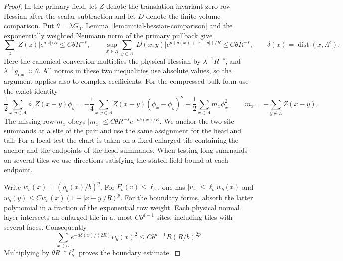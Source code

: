 \documentclass[11pt]{article}
\theoremstyle{definition}
\begin{document}
\begin{proof}
In the primary field, let \(Z\) denote the translation-invariant
zero-row Hessian after the scalar subtraction and let \(D\)
denote the finite-volume comparison. Put
\(\theta=\lambda G_0\). Lemma~\ref{lem:initial-hessian-comparison}
and the exponentially weighted
Neumann norm of the primary pullback give
\begin{equation}
 \sum_z |Z(z)|e^{a|z|/R}\le C\theta R^{-s},\qquad
 \sup_{x\in\Lambda}\sum_{y\in\Lambda}
   |D(x,y)|e^{a(\delta(x)+|x-y|)/R}\le C\theta R^{-s},
 \qquad \delta(x)=\operatorname{dist}(x,\Lambda^c).
\end{equation}
Here the canonical conversion multiplies the physical Hessian
by \(\lambda^{-1}R^{-s}\), and
\(\lambda^{-1}g_{\mathrm{mic}}\asymp\theta\).
All norms in these two inequalities use absolute values, so the
argument applies also to complex coefficients. For the compressed
bulk form use the exact identity
\begin{equation}
 \frac12\sum_{x,y\in\Lambda}\phi_x Z(x-y)\phi_y
 =-\frac14\sum_{x,y\in\Lambda}Z(x-y)(\phi_x-\phi_y)^2
   +\frac12\sum_{x\in\Lambda}m_x\phi_x^2,
 \qquad
 m_x=-\sum_{y\notin\Lambda}Z(x-y).
\end{equation}
The missing row \(m_x\) obeys
\(|m_x|\le C\theta R^{-s}e^{-a\delta(x)/R}\).
We anchor the two-site summands at a site of the pair and use
the same assignment for the head and tail. For a local test the
chart is taken on a fixed enlarged tile containing the anchor
and the endpoints of the head summands. When testing long
summands on several tiles we use directions satisfying the
stated field bound at each endpoint.

Write \(w_b(x)=(\rho_b(x)/b)^p\). For \(F_b(v)\le\ell_b\),
one has \(|v_x|\le\ell_b w_b(x)\) and
\(w_b(y)\le Cw_b(x)(1+|x-y|/R)^p\). For the boundary forms,
absorb the latter polynomial in a fraction of the exponential
row weight. Each physical normal layer intersects an enlarged
tile in at most \(Cb^{d-1}\) sites, including tiles with several
faces. Consequently
\begin{equation}
 \sum_{x\in U}e^{-a\delta(x)/(2R)}w_b(x)^2
       \le C b^{d-1}R(R/b)^{2p}.
\end{equation}
Multiplying by \(\theta R^{-s}\ell_b^2\) proves the boundary
estimate.


\end{proof}
\end{document}
